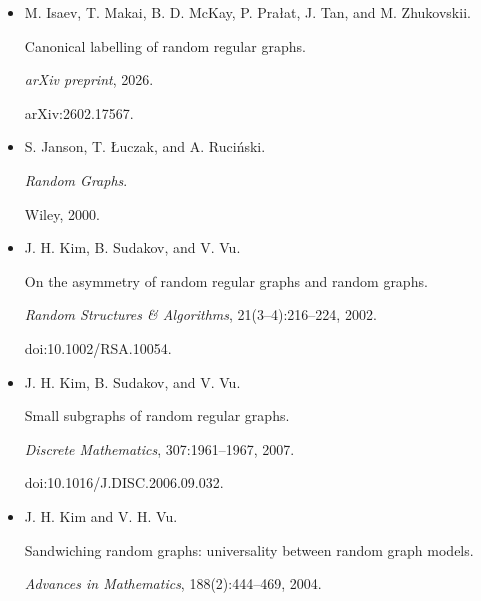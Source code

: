 \begin{itemize}
N. Immerman and E. S. Lander.


Describing graphs: A first-order approach to graph canonization.


In \emph{Complexity Theory Retrospective}, pages 59–81. Springer, New
York, 1990.





\item[] 
[29]

M. Isaev, T. Makai, B. D. McKay, P. Prałat, J. Tan, and M. Zhukovskii.


Canonical labelling of random regular graphs.


\emph{arXiv preprint}, 2026.


arXiv:2602.17567.





\item[] 
[30]

S. Janson, T. Łuczak, and A. Ruciński.


\emph{Random Graphs}.


Wiley, 2000.





\item[] 
[31]

J. H. Kim, B. Sudakov, and V. Vu.


On the asymmetry of random regular graphs and random graphs.


\emph{Random Structures \& Algorithms}, 21(3–4):216–224, 2002.


doi:10.1002/RSA.10054.





\item[] 
[32]

J. H. Kim, B. Sudakov, and V. Vu.


Small subgraphs of random regular graphs.


\emph{Discrete Mathematics}, 307:1961–1967, 2007.


doi:10.1016/J.DISC.2006.09.032.





\item[] 
[33]

J. H. Kim and V. H. Vu.


Sandwiching random graphs: universality between random graph models.


\emph{Advances in Mathematics}, 188(2):444–469, 2004.






\end{itemize}
